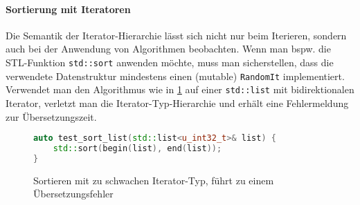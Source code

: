 \documentclass[runningheads]{llncs}
\begin{document}
\paragraph{Sortierung mit Iteratoren}

Die Semantik der Iterator-Hierarchie lässt sich nicht nur beim Iterieren, sondern auch bei der Anwendung von Algorithmen beobachten.
Wenn man bspw. die STL-Funktion \texttt{std::sort} anwenden möchte, muss man sicherstellen, dass die verwendete Datenstruktur mindestens einen (mutable) \texttt{RandomIt} implementiert.
Verwendet man den Algorithmus wie in \ref{code:sorting-legacy} auf einer \texttt{std::list} mit bidirektionalen Iterator, verletzt man die Iterator-Typ-Hierarchie und erhält eine Fehlermeldung zur Übersetzungszeit.

\begin{figure}
	\caption{Sortieren mit zu schwachen Iterator-Typ, führt zu einem Übersetzungsfehler}
	\label{code:sorting-legacy}
	\begin{lstlisting}[language=C++]
auto test_sort_list(std::list<u_int32_t>& list) {
	std::sort(begin(list), end(list));
}\end{lstlisting}
\end{figure}

%
%

\end{document}

